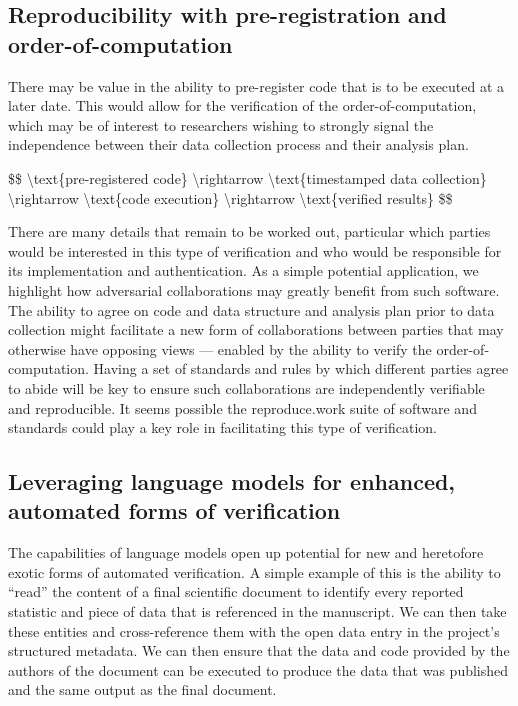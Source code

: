 \hypertarget{reproducibility-with-pre-registration-and-order-of-computation}{%
\subsection{Reproducibility with pre-registration and order-of-computation}\label{reproducibility-with-pre-registration-and-order-of-computation}}

There may be value in the ability to pre-register code that is to be executed at a later date. This would allow for the verification of the order-of-computation, which may be of interest to researchers wishing to strongly signal the independence between their data collection process and their analysis plan.

\$\$ \textbackslash{}text\{pre-registered code\} \textbackslash{}rightarrow \textbackslash{}text\{timestamped data collection\} \textbackslash{}rightarrow \textbackslash{}text\{code execution\} \textbackslash{}rightarrow \textbackslash{}text\{verified results\} \$\$

There are many details that remain to be worked out, particular which parties would be interested in this type of verification and who would be responsible for its implementation and authentication.
As a simple potential application, we highlight how adversarial collaborations may greatly benefit from such software. The ability to agree on code and data structure and analysis plan prior to data collection might facilitate a new form of collaborations between parties that may otherwise have opposing views --- enabled by the ability to verify the order-of-computation. Having a set of standards and rules by which different parties agree to abide will be key to ensure such collaborations are independently verifiable and reproducible.  It seems possible the reproduce.work suite of software and standards could play a key role in facilitating this type of verification.

\hypertarget{leveraging-language-models-for-enhanced-automated-forms-of-verification}{%
\subsection{Leveraging language models for enhanced, automated forms of verification}\label{leveraging-language-models-for-enhanced-automated-forms-of-verification}}

The capabilities of language models open up potential for new and heretofore exotic forms of automated verification. 
A simple example of this is the ability to ``read'' the content of a final scientific document to identify every reported statistic and piece of data that is referenced in the manuscript. We can then take these entities and cross-reference them with the open data entry in the project's structured metadata. We can then ensure that the data and code provided by the authors of the document can be executed to produce the data that was published and the same output as the final document.

